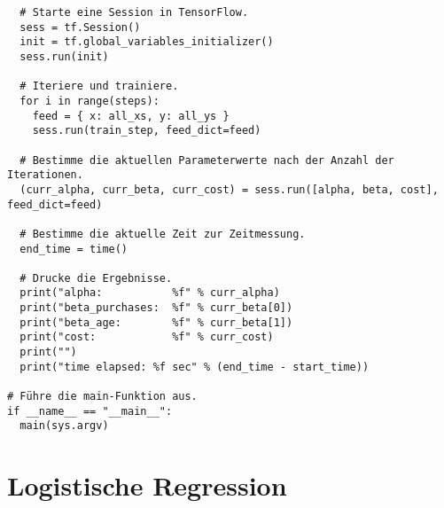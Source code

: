 \begin{verbatim}
  # Starte eine Session in TensorFlow.
  sess = tf.Session()
  init = tf.global_variables_initializer()
  sess.run(init)

  # Iteriere und trainiere.
  for i in range(steps):
    feed = { x: all_xs, y: all_ys }
    sess.run(train_step, feed_dict=feed)

  # Bestimme die aktuellen Parameterwerte nach der Anzahl der Iterationen.
  (curr_alpha, curr_beta, curr_cost) = sess.run([alpha, beta, cost], feed_dict=feed)

  # Bestimme die aktuelle Zeit zur Zeitmessung.
  end_time = time()

  # Drucke die Ergebnisse.
  print("alpha:           %f" % curr_alpha)
  print("beta_purchases:  %f" % curr_beta[0])
  print("beta_age:        %f" % curr_beta[1])
  print("cost:            %f" % curr_cost)
  print("")
  print("time elapsed: %f sec" % (end_time - start_time))

# Führe die main-Funktion aus.
if __name__ == "__main__":
  main(sys.argv)
\end{verbatim}

\section{Logistische Regression}
\label{appendix:C:3}

